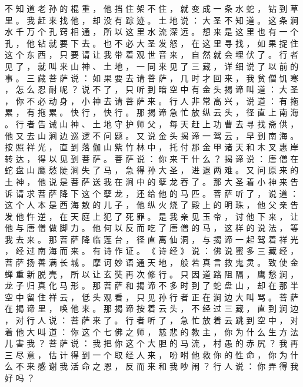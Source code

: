 {不 知 道 老 孙 的 棍 重 ， 他 挡 住 架 不 住 ， 就 变 成 一 条 水 蛇 ， 钻 到 草 里 。
我 赶 来 找 他 ， 却 没 有 踪 迹 。
土 地 说 ： 大 圣 不 知 道 。
这 条 涧 水 千 万 个 孔 窍 相 通 ， 所 以 这 里 水 流 深 远 。
想 来 是 这 里 也 有 一 个 孔 ， 他 钻 就 要 下 去 。
也 不 必 大 圣 发 怒 ， 在 这 里 寻 找 ， 如 果 捉 住 这 个 东 西 ， 只 要 请 让 我 带 着 观 世 音 来 ， 自 然 就 会 埋 伏 了 。
行 者 见 了 ， 就 叫 来 山 神 、 土 地 ， 一 同 来 见 了 三 藏 ， 详 细 说 了 以 前 的 事 。
三 藏 菩 萨 说 ： 如 果 要 去 请 菩 萨 ， 几 时 才 回 来 ， 我 贫 僧 饥 寒 ， 怎 么 忍 耐 呢 ？ 说 不 了 ， 只 听 到 暗 空 中 有 金 头 揭 谛 叫 道 ： 大 圣 ， 你 不 必 动 身 ， 小 神 去 请 菩 萨 来 。
行 人 非 常 高 兴 ， 说 道 ： 有 拖 累 ， 有 拖 累 。
快 行 ， 快 行 。
那 揭 谛 急 忙 放 纵 云 头 ， 径 直 上 南 海 。
行 者 告 诫 山 神 、 土 地 守 护 师 父 ， 每 天 赶 上 功 曹 去 寻 找 斋 供 ， 他 又 去 山 涧 边 巡 逻 不 问 题 。
又 说 金 头 揭 谛 一 驾 云 ， 早 到 南 海 。
按 照 祥 光 ， 直 到 落 伽 山 紫 竹 林 中 ， 托 付 那 金 甲 诸 天 和 木 叉 惠 岸 转 达 ， 得 以 见 到 菩 萨 。
菩 萨 说 ： 你 来 干 什 么 ？ 揭 谛 说 ： 唐 僧 在 蛇 盘 山 鹰 愁 陡 涧 失 了 马 ， 急 得 孙 大 圣 ， 进 退 两 难 。
又 问 原 来 的 土 神 ， 他 说 是 菩 萨 送 我 在 涧 中 的 孽 龙 吞 了 。
那 大 圣 着 小 神 来 告 诉 请 求 菩 萨 降 下 这 个 孽 龙 ， 还 给 他 的 马 匹 。
菩 萨 听 了 ， 说 道 ： 这 个 人 本 是 西 海 敖 的 儿 子 ， 他 纵 火 烧 了 殿 上 的 明 珠 ， 他 父 亲 告 发 他 忤 逆 ， 在 天 庭 上 犯 了 死 罪 。
是 我 亲 见 玉 帝 ， 讨 他 下 来 ， 让 他 与 唐 僧 做 脚 力 。
他 何 以 反 而 吃 了 唐 僧 的 马 ， 这 样 的 说 法 ， 等 我 去 来 。
那 菩 萨 降 临 莲 台 ， 径 直 离 仙 洞 ， 与 揭 谛 一 起 驾 着 祥 光 ， 经 过 南 海 而 来 。
有 诗 作 证 。
《 诗 经 》 说 ： 佛 说 蜜 多 三 藏 经 ， 菩 萨 扬 善 满 长 城 。
摩 诃 妙 语 通 天 地 ， 般 若 真 言 救 鬼 灵 。
致 使 金 蝉 重 新 脱 壳 ， 所 以 让 玄 奘 再 次 修 行 。
只 因 道 路 阻 隔 ， 鹰 愁 涧 ， 龙 子 归 真 化 马 形 。
那 菩 萨 和 揭 谛 不 多 时 到 了 蛇 盘 山 ， 却 在 那 半 空 中 留 住 祥 云 ， 低 头 观 看 ， 只 见 孙 行 者 正 在 涧 边 大 叫 骂 。
菩 萨 在 揭 谛 里 ， 唤 他 来 。
那 揭 谛 按 着 云 头 ， 不 经 过 三 藏 ， 直 到 涧 边 ， 对 行 人 说 ： 菩 萨 来 了 。
行 者 听 了 ， 急 忙 放 着 云 跳 到 空 中 ， 对 着 他 大 叫 道 ： 你 这 个 七 佛 之 师 ， 慈 悲 的 教 主 ， 你 为 什 么 生 方 法 儿 害 我 ？ 菩 萨 说 ： 我 把 你 这 个 大 胆 的 马 流 ， 村 愚 的 赤 尻 ？
我 再 三 尽 意 ， 估 计 得 到 一 个 取 经 人 来 ， 吩 咐 他 救 你 的 性 命 ， 你 为 什 么 不 来 感 谢 我 活 命 之 恩 ， 反 而 来 和 我 吵 闹 ？ 行 人 说 ： 你 弄 得 我 好 吗 ？
}
